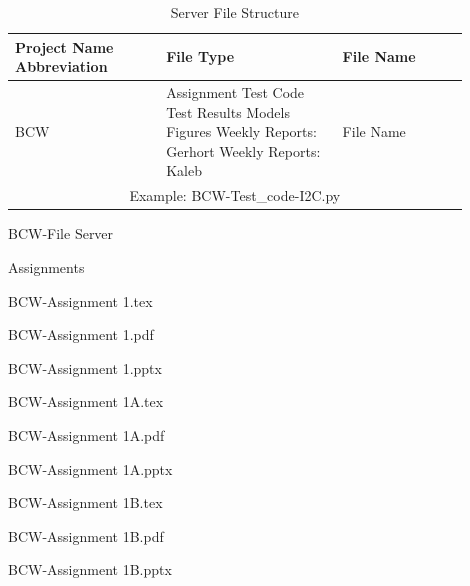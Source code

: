 \documentclass[conference]{IEEEtran}
\begin{document}
    
    \begin{table}[!ht]%
        \centering
            \begin{tabular}{|>{}p{0.3\linewidth}|>{}p{0.35\linewidth}|>{}p{0.25\linewidth}|}
            
            \hline

             \rowcolor{black!20} \textbf{Project Name Abbreviation } &  \textbf{File Type} & \textbf{File Name}
            
            \\ \hline

            {BCW} & Assignment \newline Test Code \newline Test Results \newline Models \newline Figures \newline Weekly Reports: Gerhort \newline Weekly Reports: Kaleb & File Name

            \\ \hline

            \multicolumn{3}{|c|}{Example: BCW-Test_code-I2C.py}

            \\ \hline

        \end{tabular}           
        \caption{Server File Structure}
        \label{tab:server_file_structure}
    \end{table}

    BCW-File Server 
    
    \indent\indent Assignments 
    
    \indent\indent\indent BCW-Assignment 1.tex 
    
    \indent\indent\indent BCW-Assignment 1.pdf 
    
    \indent\indent\indent BCW-Assignment 1.pptx 
    
    \indent\indent\indent BCW-Assignment 1A.tex 

    \indent\indent\indent BCW-Assignment 1A.pdf 
    
    \indent\indent\indent BCW-Assignment 1A.pptx 
    
    \indent\indent\indent BCW-Assignment 1B.tex 
    
    \indent\indent\indent BCW-Assignment 1B.pdf 
    
    \indent\indent\indent BCW-Assignment 1B.pptx 
    
\end{document}
